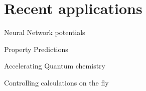 \section{Recent applications}
\begin{frame}[t]{Neural Network potentials}

\end{frame}
\begin{frame}[t]{Property Predictions}

\end{frame}
\begin{frame}[t]{Accelerating Quantum chemistry}

\end{frame}
\begin{frame}[t]{Controlling calculations on the fly}

\end{frame}
